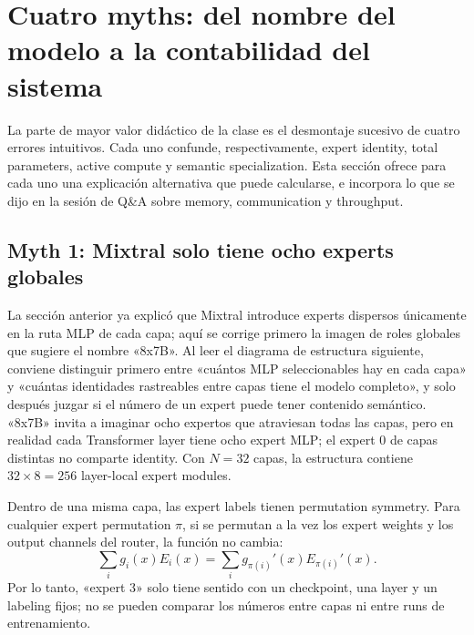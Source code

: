 \section{Cuatro myths: del nombre del modelo a la contabilidad del sistema}

La parte de mayor valor didáctico de la clase es el desmontaje sucesivo de cuatro errores intuitivos. Cada uno confunde, respectivamente, expert identity, total parameters, active compute y semantic specialization. Esta sección ofrece para cada uno una explicación alternativa que puede calcularse, e incorpora lo que se dijo en la sesión de Q\&A sobre memory, communication y throughput.

\subsection{Myth 1: Mixtral solo tiene ocho experts globales}

La sección anterior ya explicó que Mixtral introduce experts dispersos únicamente en la ruta MLP de cada capa; aquí se corrige primero la imagen de roles globales que sugiere el nombre «8x7B». Al leer el diagrama de estructura siguiente, conviene distinguir primero entre «cuántos MLP seleccionables hay en cada capa» y «cuántas identidades rastreables entre capas tiene el modelo completo», y solo después juzgar si el número de un expert puede tener contenido semántico. «8x7B» invita a imaginar ocho expertos que atraviesan todas las capas, pero en realidad cada Transformer layer tiene ocho expert MLP; el expert 0 de capas distintas no comparte identity. Con $N=32$ capas, la estructura contiene $32\times 8=256$ layer-local expert modules.


Dentro de una misma capa, las expert labels tienen permutation symmetry. Para cualquier expert permutation $\pi$, si se permutan a la vez los expert weights y los output channels del router, la función no cambia:
\[
\sum_i g_i(x)E_i(x)=\sum_i g_{\pi(i)}'(x)E_{\pi(i)}'(x).
\]
Por lo tanto, «expert 3» solo tiene sentido con un checkpoint, una layer y un labeling fijos; no se pueden comparar los números entre capas ni entre runs de entrenamiento.


